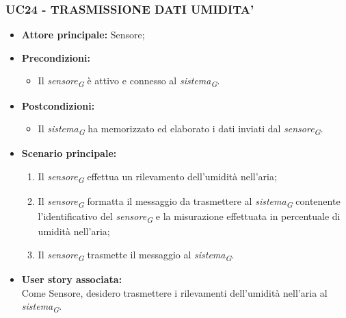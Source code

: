 \subsubsection{UC24 - TRASMISSIONE DATI UMIDITA'}
\begin{itemize}
    \item \textbf{Attore principale:} Sensore;
    \item \textbf{Precondizioni:}
        \begin{itemize}
            \item Il \textit{sensore}\textsubscript{\textit{G}} è attivo e connesso al \textit{sistema}\textsubscript{\textit{G}}. 
        \end{itemize}
    \item \textbf{Postcondizioni:}
        \begin{itemize}
            \item Il \textit{sistema}\textsubscript{\textit{G}} ha memorizzato ed elaborato i dati inviati dal \textit{sensore}\textsubscript{\textit{G}}.
        \end{itemize}
    \item \textbf{Scenario principale:}
        \begin{enumerate}
            \item Il \textit{sensore}\textsubscript{\textit{G}} effettua un rilevamento dell'umidità nell'aria;
            \item Il \textit{sensore}\textsubscript{\textit{G}} formatta il messaggio da trasmettere al \textit{sistema}\textsubscript{\textit{G}} contenente l'identificativo del \textit{sensore}\textsubscript{\textit{G}} e la misurazione effettuata in percentuale di umidità nell’aria;
            \item Il \textit{sensore}\textsubscript{\textit{G}} trasmette il messaggio al \textit{sistema}\textsubscript{\textit{G}}.
        \end{enumerate}
    \item \textbf{User story associata:} \\
    Come Sensore, desidero trasmettere i rilevamenti dell'umidità nell'aria al \textit{sistema}\textsubscript{\textit{G}}.
\end{itemize}
